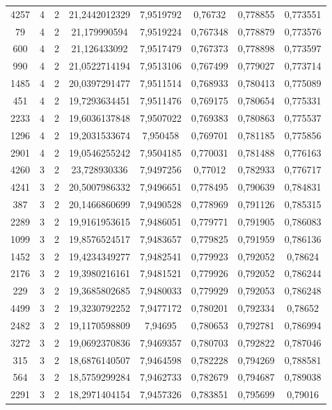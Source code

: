 \begin{longtable}{|c|c|c|c|c|c|c|c|}
4257 & 4 & 2 & 21,2442012329 & 7,9519792 & 0,76732 & 0,778855 & 0,773551 \\
79 & 4 & 2 & 21,179990594 & 7,9519224 & 0,767348 & 0,778879 & 0,773576 \\
600 & 4 & 2 & 21,126433092 & 7,9517479 & 0,767373 & 0,778898 & 0,773597 \\
990 & 4 & 2 & 21,0522714194 & 7,9513106 & 0,767499 & 0,779027 & 0,773714 \\
1485 & 4 & 2 & 20,0397291477 & 7,9511514 & 0,768933 & 0,780413 & 0,775089 \\
451 & 4 & 2 & 19,7293634451 & 7,9511476 & 0,769175 & 0,780654 & 0,775331 \\
2233 & 4 & 2 & 19,6036137848 & 7,9507022 & 0,769383 & 0,780863 & 0,775537 \\
1296 & 4 & 2 & 19,2031533674 & 7,950458 & 0,769701 & 0,781185 & 0,775856 \\
2901 & 4 & 2 & 19,0546255242 & 7,9504185 & 0,770031 & 0,781488 & 0,776163 \\
4260 & 3 & 2 & 23,728930336 & 7,9497256 & 0,77012 & 0,782933 & 0,776717 \\
4241 & 3 & 2 & 20,5007986332 & 7,9496651 & 0,778495 & 0,790639 & 0,784831 \\
387 & 3 & 2 & 20,1466860699 & 7,9490528 & 0,778969 & 0,791126 & 0,785315 \\
2289 & 3 & 2 & 19,9161953615 & 7,9486051 & 0,779771 & 0,791905 & 0,786083 \\
1099 & 3 & 2 & 19,8576524517 & 7,9483657 & 0,779825 & 0,791959 & 0,786136 \\
1452 & 3 & 2 & 19,4234349277 & 7,9482541 & 0,779923 & 0,792052 & 0,78624 \\
2176 & 3 & 2 & 19,3980216161 & 7,9481521 & 0,779926 & 0,792052 & 0,786244 \\
229 & 3 & 2 & 19,3685802685 & 7,9480033 & 0,779929 & 0,792053 & 0,786248 \\
4499 & 3 & 2 & 19,3230792252 & 7,9477172 & 0,780201 & 0,792334 & 0,78652 \\
2482 & 3 & 2 & 19,1170598809 & 7,94695 & 0,780653 & 0,792781 & 0,786994 \\
3272 & 3 & 2 & 19,0692370836 & 7,9469357 & 0,780703 & 0,792822 & 0,787046 \\
315 & 3 & 2 & 18,6876140507 & 7,9464598 & 0,782228 & 0,794269 & 0,788581 \\
564 & 3 & 2 & 18,5759299284 & 7,9462733 & 0,782679 & 0,794687 & 0,789038 \\
2291 & 3 & 2 & 18,2971404154 & 7,9457326 & 0,783851 & 0,795699 & 0,79016 \\

\end{longtable}
